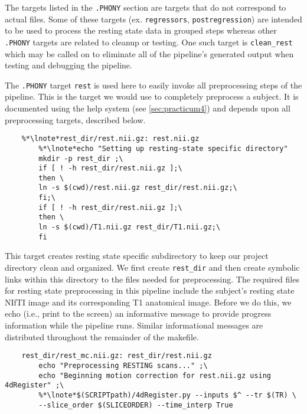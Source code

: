  The targets listed in the \texttt{.PHONY} section are targets that do not correspond to actual files.   Some of these targets (ex. \texttt{regressors}, \texttt{postregression}) are intended to be used to process the resting state data in grouped steps whereas other \texttt{.PHONY} targets are related to cleanup or testing. One such target is \texttt{clean_rest} which may be called on to eliminate all of the pipeline's generated output when testing and debugging the pipeline.


The \texttt{.PHONY} target \texttt{rest} is used here to easily invoke all preprocessing steps of the pipeline. This is the target we would use to completely preprocess a subject. It is documented using the help system (see \autoref{sec:practicum4}) and depends upon all preprocessing targets, described below.

\begin{lstlisting}
	%*\lnote*rest_dir/rest.nii.gz: rest.nii.gz 
		%*\lnote*echo "Setting up resting-state specific directory" 
		mkdir -p rest_dir ;\
		if [ ! -h rest_dir/rest.nii.gz ];\
		then \
		ln -s $(cwd)/rest.nii.gz rest_dir/rest.nii.gz;\
		fi;\
		if [ ! -h rest_dir/rest.nii.gz ];\
		then \
		ln -s $(cwd)/T1.nii.gz rest_dir/T1.nii.gz;\
		fi
\end{lstlisting}

\lnum{4} This target creates resting state specific subdirectory to keep our project directory clean and organized. We first create \texttt{rest_dir} and then create symbolic links within this directory to the files needed for preprocessing. The required files for resting state preprocessing in this pipeline include the subject's resting state NIfTI image and its corresponding T1 anatomical image.   Before we do this, we echo (i.e., print to the screen) an informative message to provide progress information while the pipeline runs. Similar informational messages are distributed throughout the remainder of the makefile.

\begin{lstlisting}
	rest_dir/rest_mc.nii.gz: rest_dir/rest.nii.gz
		echo "Preprocessing RESTING scans..." ;\
		echo "Beginning motion correction for rest.nii.gz using 4dRegister" ;\
		%*\lnote*$(SCRIPTpath)/4dRegister.py --inputs $^ --tr $(TR) \
		--slice_order $(SLICEORDER) --time_interp True

\end{lstlisting}

